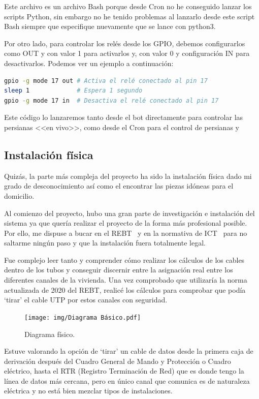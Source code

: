 Este archivo es un archivo Bash porque desde Cron no he conseguido lanzar los scripts Python, sin embargo no he tenido problemas al lanzarlo desde este script Bash siempre que especifique nuevamente que se lance con python3.

Por otro lado, para controlar los relés desde los GPIO, debemos configurarlos como OUT y con valor 1 para activarlos y, con valor 0 y configuración IN para desactivarlos. Podemos ver un ejemplo a continuación:
\begin{lstlisting}[language=sh, caption={Ejemplo activación y desactivación de relé.}]
gpio -g mode 17 out # Activa el relé conectado al pin 17
sleep 1             # Espera 1 segundo
gpio -g mode 17 in  # Desactiva el relé conectado al pin 17
\end{lstlisting}

Este código lo lanzaremos tanto desde el bot directamente para controlar las persianas <<en vivo>>, como desde el Cron para el control de persianas y 

\subsection{Instalación física}

Quizás, la parte más compleja del proyecto ha sido la instalación física dado mi grado de desconocimiento así como el encontrar las piezas idóneas para el domicilio.

Al comienzo del proyecto, hubo una gran parte de investigación e instalación del sistema ya que quería realizar el proyecto de la forma más profesional posible. Por ello, me dispuse a bucar en el REBT~\cite{manual:REBT} y en la normativa de ICT~\cite{manual:ICT-BT-21} para no saltarme ningún paso y que la instalación fuera totalmente legal.

Fue complejo leer tanto y comprender cómo realizar los cálculos de los cables dentro de los tubos y conseguir discernir entre la asignación real entre los diferentes canales de la vivienda. Una vez comprobado que utilizaría la norma actualizada de 2020 del REBT, realicé los cálculos para comprobar que podía `tirar' el cable UTP por estos canales con seguridad. 

\begin{figure}[h]
    \centering
    \texttt{[image: img/Diagrama Básico.pdf]}
    \caption{Diagrama físico. } \label{Img:diagramaBasico}
\end{figure}

Estuve valorando la opción de ‘tirar’ un cable de datos desde la primera caja de derivación después del Cuadro General de Mando y Protección o Cuadro eléctrico, hasta el RTR (Registro Terminación de Red) que es donde tengo la línea de datos más cercana, pero en único canal que comunica es de naturaleza eléctrica y no está bien mezclar tipos de instalaciones.

